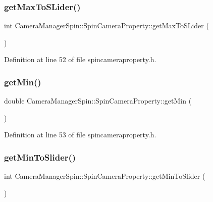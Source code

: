 \subsubsection{\texorpdfstring{getMaxToSLider()}{getMaxToSLider()}}
{\footnotesize\ttfamily int Camera\+Manager\+Spin\+::\+Spin\+Camera\+Property\+::get\+Max\+To\+S\+Lider (\begin{DoxyParamCaption}{ }\end{DoxyParamCaption})\hspace{0.3cm}{\ttfamily [inline]}}



Definition at line 52 of file spincameraproperty.\+h.

\mbox{\label{class_camera_manager_spin_1_1_spin_camera_property_a22774e095a9628a0948e438afd48e6e4}} 
\subsubsection{\texorpdfstring{getMin()}{getMin()}}
{\footnotesize\ttfamily double Camera\+Manager\+Spin\+::\+Spin\+Camera\+Property\+::get\+Min (\begin{DoxyParamCaption}{ }\end{DoxyParamCaption})\hspace{0.3cm}{\ttfamily [inline]}}



Definition at line 53 of file spincameraproperty.\+h.

\mbox{\label{class_camera_manager_spin_1_1_spin_camera_property_a3ec56e93dc2b15a87795a8985277f632}} 
\subsubsection{\texorpdfstring{getMinToSlider()}{getMinToSlider()}}
{\footnotesize\ttfamily int Camera\+Manager\+Spin\+::\+Spin\+Camera\+Property\+::get\+Min\+To\+Slider (\begin{DoxyParamCaption}{ }\end{DoxyParamCaption})\hspace{0.3cm}{\ttfamily [inline]}}




